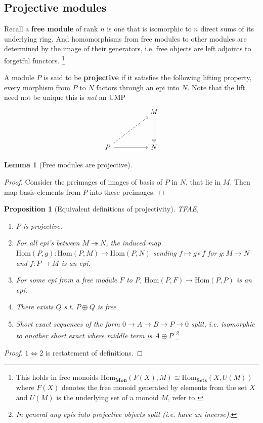 \documentclass[12pt]{article}
\numberwithin{equation}{section}
\newcommand{\Hom}{{\mathrm{Hom}}}
\newtheorem{lemma}[theorem]{Lemma}
\newtheorem{proposition}{Proposition}[section]
\begin{document}
	
	\begin{appendices}
	\section{Projective modules}
	Recall a\textbf{ free module} of rank $n$ is one that is isomorphic to $n$ direct sums of its underlying ring. And homomorphisms from free modules to other modules are determined by the image of their generators, i.e. free objects are left adjoints to forgetful functors. \footnote{This holds in free monoids $\mathrm{Hom}_\mathbf{Mon}(F(X), M) \cong \mathrm{Hom}_\mathbf{Sets} (X, U(M))$ where $F(X)$ denotes the free monoid generated by elements from the set $X$ and $U(M)$ is the underlying set of a monoid $M$, refer to \cite[p. ~208]{Awodey} }
	
	A module $P$ is said to be \textbf{projective} if it satisfies the following lifting property, every morphism from $P$ to $N$ factors through an epi into $N$. Note that the lift need not be unique this is \textit{not} an UMP
	\[\begin{tikzcd}
		&& M \\
		\\
		P && N
		\arrow[two heads, from=1-3, to=3-3]
		\arrow[from=3-1, to=3-3]
		\arrow[dashed, from=3-1, to=1-3]
	\end{tikzcd}\]
	\begin{lemma}[Free modules are projective]
	\end{lemma}
	\begin{proof}
		Consider the preimages of images of basis of $P$ in $N$, that lie in $M$. Then map basis elements from $P$ into these preimages.
	\end{proof}
	\begin{proposition}[Equivalent definitions of projectivity]\label{projtfae}
		TFAE,
		\begin{enumerate}
			\item $P$ is projective.
			\item For all epi's between $M\twoheadrightarrow N$, the induced map $\Hom(P,g):\mathrm{Hom}(P,M) \to \mathrm{Hom}(P,N)$ sending $f \mapsto g \circ f$ for $g:M \to N$ and $f:P \to M$ is an epi.
			\item For some epi from a free module $F$ to $P$, $\mathrm{Hom}(P,F) \to \mathrm{Hom}(P,P)$ is an epi.
			\item There exists $Q$ s.t. $P \oplus Q$ is free
			\item Short exact sequences of the form $0 \to A \to B \to P \to 0$ split, i.e. isomorphic to another short exact where middle term is $A \oplus P$ \footnote{In general any epis into projective objects split (i.e. have an inverse).}
		\end{enumerate}
	\end{proposition}
	\begin{proof}
		$1 \iff 2$ is restatement of definitions.
		

\end{proof}
\end{appendices}
\end{document}
